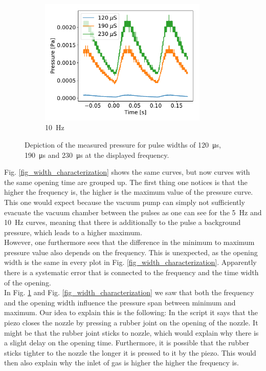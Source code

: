 \documentclass[a4paper,10pt]{article}
\begin{document}
\begin{figure}[H]
\begin{subfigure}[t]{0.45 \textwidth}
    \centering
    \includegraphics[height=6cm]{part1_10_hertz.pdf}
    \caption{\SI{10}{\hertz}}
  \end{subfigure}
  \caption{Depiction of the measured pressure for pulse widths of \SI{120}{\micro \s}, \SI{190}{\micro \s} and \SI{230}{\micro \s} at the displayed frequency. }
  \label{fig_pressure_characterization}
\end{figure}
Fig. \ref{fig_width_characterization} shows the same curves, but now curves with the same opening time are grouped up. The first thing one notices is that the higher the frequency is, the higher is the maximum value of the pressure curve. This one would expect because the vacuum pump can simply not sufficiently evacuate the vacuum chamber between the pulses as one can see for the \SI{5}{\hertz} and \SI{10}{\hertz} curves, meaning that there is additionally to the pulse a background pressure, which leads to a higher maximum. 
\\
However, one furthermore sees that the difference in the minimum to maximum pressure value also depends on the frequency. This is unexpected, as the opening width is the same in every plot in Fig. \ref{fig_width_characterization}. Apparently there is a systematic error that is connected to the frequency and the time width of the opening. %
\\
In Fig. \ref{fig_pressure_characterization} and Fig. \ref{fig_width_characterization} we saw that both the frequency and the opening width influence the pressure span between minimum and maximum. Our idea to explain this is the following: In the script \cite{script} it says that the piezo closes the nozzle by pressing a rubber joint on the opening of the nozzle. It might be that the rubber joint sticks to nozzle, which would explain why there is a slight delay on the opening time. Furthermore, it is possible that the rubber sticks tighter to the nozzle the longer it is pressed to it by the piezo. This would then also explain why the inlet of gas is higher the higher the frequency is. 
\end{document}
